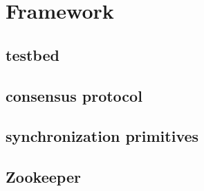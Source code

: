 \section{Framework}\label{sec:framework}

\subsection{testbed}

\subsection{consensus protocol}

\subsection{synchronization primitives}


\subsection{Zookeeper}


